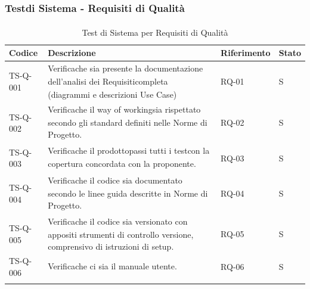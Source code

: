 \documentclass[a4paper,11pt]{article}
\renewcommand{\G}{\texorpdfstring{\textsubscript{\scalebox{0.6}{\textbf{G}}}\xspace}{ G}}
\begin{document}
\subsubsection{Test\G di Sistema - Requisiti di Qualità\G}
\begin{longtable}{|p{2.5cm}|p{8cm}|p{2.5cm}|p{1.5cm}|}
\hline
\rowcolor{primaryblue!30} 
\textbf{Codice} & \textbf{Descrizione} & \textbf{Riferimento} & \textbf{Stato} \\
\hline
\endhead

TS-Q-001 & Verifica\G che sia presente la documentazione dell'analisi dei Requisiti\G completa (diagrammi e descrizioni Use Case) & RQ-01 & S \\ \hline
TS-Q-002 & Verifica\G che il way of working\G sia rispettato secondo gli standard definiti nelle Norme di Progetto\G. & RQ-02 & S \\ \hline
TS-Q-003 & Verifica\G che il prodotto\G passi tutti i test\G con la
copertura concordata con la proponente\G. & RQ-03 & S \\ \hline
TS-Q-004 & Verifica\G che il codice sia documentato secondo le linee guida descritte in Norme di
Progetto\G. & RQ-04 & S \\ \hline
TS-Q-005 & Verifica\G che il codice sia versionato con appositi strumenti di controllo versione, comprensivo di istruzioni di setup. & RQ-05 & S \\ \hline
TS-Q-006 & Verifica\G che ci sia il manuale utente\G. & RQ-06 & S \\ \hline

\caption{Test di Sistema per Requisiti di Qualità}
\label{tab:test-sistema-qualita}
\end{longtable}

\newpage
\end{document}
